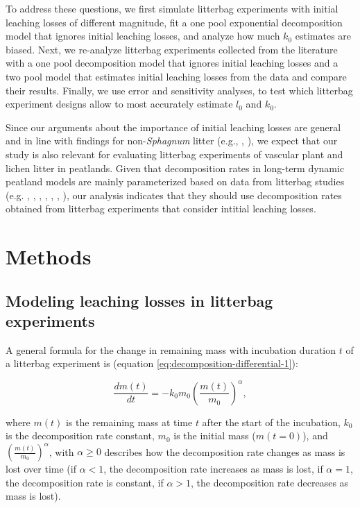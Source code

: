 \documentclass[bg, manuscript]{copernicus}
\begin{document}
To address these questions, we first simulate litterbag experiments with initial leaching losses of different magnitude, fit a one pool exponential decomposition model that ignores initial leaching losses, and analyze how much \(k_0\) estimates are biased. Next, we re-analyze litterbag experiments collected from the literature with a one pool decomposition model that ignores initial leaching losses and a two pool model that estimates initial leaching losses from the data and compare their results. Finally, we use error and sensitivity analyses, to test which litterbag experiment designs allow to most accurately estimate \(l_0\) and \(k_0\).

Since our arguments about the importance of initial leaching losses are general and in line with findings for non-\emph{Sphagnum} litter (e.g., \citet{Barlocher.1997}, \citet{Lind.2022}), we expect that our study is also relevant for evaluating litterbag experiments of vascular plant and lichen litter in peatlands. Given that decomposition rates in long-term dynamic peatland models are mainly parameterized based on data from litterbag studies (e.g. \citet{Frolking.2001}, \citet{Bauer.2004}, \citet{Heijmans.2008}, \citet{Heinemeyer.2010}, \citet{Morris.2012}, \citet{Chaudhary.2018}, \citet{Bona.2020}), our analysis indicates that they should use decomposition rates obtained from litterbag experiments that consider intitial leaching losses.

\section{Methods}

\hypertarget{out-methods-1}{%
\subsection{Modeling leaching losses in litterbag experiments}\label{out-methods-1}}

A general formula for the change in remaining mass with incubation duration \(t\) of a litterbag experiment is \citep{Frolking.2001} (equation \eqref{eq:decomposition-differential-1}):

\begin{equation}
\frac{dm(t)}{dt} = -k_0 m_0 \left(\frac{m(t)}{m_0}\right)^\alpha,
\label{eq:decomposition-differential-1}
\end{equation}

where \(m(t)\) is the remaining mass at time \(t\) after the start of the incubation, \(k_0\) is the decomposition rate constant, \(m_0\) is the initial mass (\(m(t = 0)\)), and \(\left(\frac{m(t)}{m_0}\right)^\alpha\), with \(\alpha \ge 0\) describes how the decomposition rate changes as mass is lost over time (if \(\alpha<1\), the decomposition rate increases as mass is lost, if \(\alpha=1\), the decomposition rate is constant, if \(\alpha>1\), the decomposition rate decreases as mass is lost).
\end{document}
